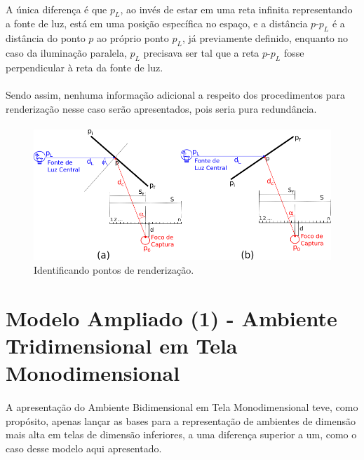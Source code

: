 \documentclass{article}
\begin{document}
	\paragraph{}
	A única diferença é que $p_L$, ao invés de estar em uma reta infinita representando a fonte de luz, está em uma posição específica no espaço, e a distância $p$-$p_L$ é a distância do ponto $p$ ao próprio ponto $p_L$, já previamente definido, enquanto no caso da iluminação paralela, $p_L$ precisava ser tal que a reta $p$-$p_L$ fosse perpendicular à reta da fonte de luz.
	
	\paragraph{}
	Sendo assim, nenhuma informação adicional a respeito dos procedimentos para renderização nesse caso serão apresentados, pois seria pura redundância.
	
	\paragraph{}
	\begin{figure}[h]
		\centering
		\includegraphics[scale=0.7]{radiosity-radial}
		\caption{Identificando pontos de renderização.}
		\label{fig:radio-rad}
	\end{figure}

	\section{Modelo Ampliado (1) - Ambiente Tridimensional em Tela Monodimensional}
	
	\paragraph{}
	A apresentação do Ambiente Bidimensional em Tela Monodimensional teve, como propósito, apenas lançar as bases para a representação de ambientes de dimensão mais alta em telas de dimensão inferiores, a uma diferença superior a um, como o caso desse modelo aqui apresentado.
	
\end{document}
